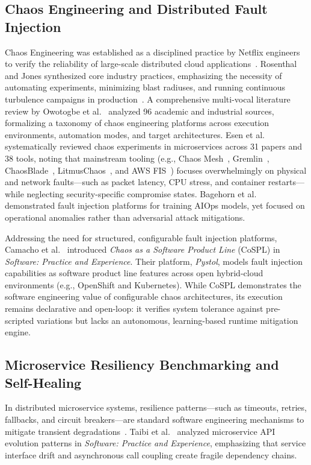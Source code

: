 \documentclass[ASNA,twocolumn]{USG}
\begin{document}
\subsection{Chaos Engineering and Distributed Fault Injection}
Chaos Engineering was established as a disciplined practice by Netflix engineers to verify the reliability of large-scale distributed cloud applications~\cite{basiri2016chaos}. Rosenthal and Jones synthesized core industry practices, emphasizing the necessity of automating experiments, minimizing blast radiuses, and running continuous turbulence campaigns in production~\cite{rosenthal2020chaos}. A comprehensive multi-vocal literature review by Owotogbe et al.~\cite{owotogbe2025chaos} analyzed 96 academic and industrial sources, formalizing a taxonomy of chaos engineering platforms across execution environments, automation modes, and target architectures. Esen et al.~\cite{esen2025chaos} systematically reviewed chaos experiments in microservices across 31 papers and 38 tools, noting that mainstream tooling (e.g., Chaos Mesh~\cite{chaosmesh2021}, Gremlin~\cite{gremlin2022}, ChaosBlade~\cite{chaosblade2021}, LitmusChaos~\cite{litmus2022}, and AWS FIS~\cite{awsfis2023}) focuses overwhelmingly on physical and network faults—such as packet latency, CPU stress, and container restarts—while neglecting security-specific compromise states. Bagehorn et al.~\cite{baghorn2022fault} demonstrated fault injection platforms for training AIOps models, yet focused on operational anomalies rather than adversarial attack mitigations.

Addressing the need for structured, configurable fault injection platforms, Camacho et al.~\cite{camacho2022chaos} introduced \textit{Chaos as a Software Product Line} (CoSPL) in \textit{Software: Practice and Experience}. Their platform, \textit{Pystol}, models fault injection capabilities as software product line features across open hybrid-cloud environments (e.g., OpenShift and Kubernetes). While CoSPL demonstrates the software engineering value of configurable chaos architectures, its execution remains declarative and open-loop: it verifies system tolerance against pre-scripted variations but lacks an autonomous, learning-based runtime mitigation engine.

\subsection{Microservice Resiliency Benchmarking and Self-Healing}
In distributed microservice systems, resilience patterns—such as timeouts, retries, fallbacks, and circuit breakers—are standard software engineering mechanisms to mitigate transient degradations~\cite{aderaldo2025declarative, schneider2015survey, soldani2023microservice}. Taibi et al.~\cite{taibi2021microservice} analyzed microservice API evolution patterns in \textit{Software: Practice and Experience}, emphasizing that service interface drift and asynchronous call coupling create fragile dependency chains.
\end{document}
